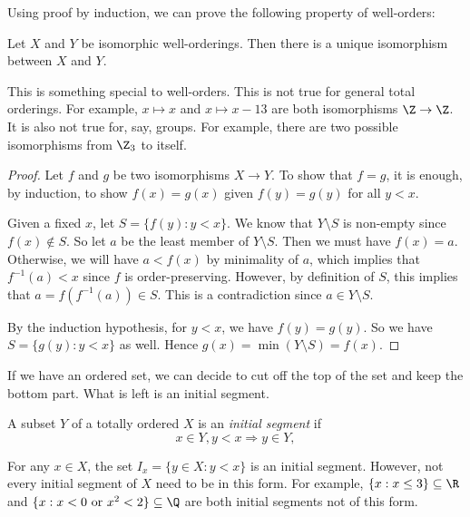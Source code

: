\documentclass[a4paper]{article}
\begin{document}
Using proof by induction, we can prove the following property of well-orders:
\begin{prop}
  Let $X$ and $Y$ be isomorphic well-orderings. Then there is a unique isomorphism between $X$ and $Y$.
\end{prop}
This is something special to well-orders. This is not true for general total orderings. For example, $x\mapsto x$ and $x\mapsto x - 13$ are both isomorphisms $\Z\to \Z$. It is also not true for, say, groups. For example, there are two possible isomorphisms from $\Z_3$ to itself.

\begin{proof}
  Let $f$ and $g$ be two isomorphisms $X\to Y$. To show that $f = g$, it is enough, by induction, to show $f(x) = g(x)$ given $f(y) = g(y)$ for all $y < x$.

  Given a fixed $x$, let $S = \{f(y): y < x\}$. We know that $Y\setminus S$ is non-empty since $f(x) \not\in S$. So let $a$ be the least member of $Y\setminus S$. Then we must have $f(x) = a$. Otherwise, we will have $a < f(x)$ by minimality of $a$, which implies that $f^{-1}(a) < x$ since $f$ is order-preserving. However, by definition of $S$, this implies that $a = f(f^{-1}(a)) \in S$. This is a contradiction since $a \in Y\setminus S$.

  By the induction hypothesis, for $y < x$, we have $f(y) = g(y)$. So we have $S = \{g(y): y < x\}$ as well. Hence $g(x) = \min(Y\setminus S) = f(x)$.
\end{proof}

If we have an ordered set, we can decide to cut off the top of the set and keep the bottom part. What is left is an initial segment.
\begin{defi}
  A subset $Y$ of a totally ordered $X$ is an \emph{initial segment} if
  \[
    x\in Y, y< x \Rightarrow y\in Y,
  \]
  \begin{center}
  \end{center}
\end{defi}

\begin{eg}
  For any $x\in X$, the set $I_x = \{y\in X: y < x\}$ is an initial segment. However, not every initial segment of $X$ need to be in this form. For example, $\{x: x\leq 3\}\subseteq \R$ and $\{x: x < 0\text{ or }x^2 < 2\}\subseteq \Q$ are both initial segments not of this form.
\end{eg}
\end{document}
